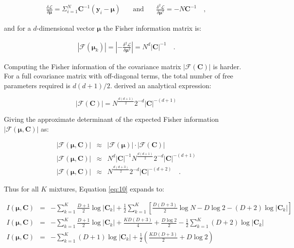 \documentclass{aastex61}
\newcommand{\vect}[1]{\boldsymbol{\mathbf{#1}}}
\def\veccov{\vect{C}}
\def\vecmean{\vect{\mu}}
\def\datum{y}
\def\data{\vect{\datum}}
\def\likelihood{\mathcal{L}}
\begin{document}
\begin{eqnarray}
  \frac{\delta\likelihood}{\delta\vecmean} = \Sigma_{i=1}^{N}\veccov^{-1}(\data_i - \vecmean)
  & \hspace{1em}\textrm{and}\hspace{1em}
  & \frac{\delta^2\likelihood}{\delta\vecmean^2} = -N\veccov^{-1} \quad ,
\end{eqnarray}

\noindent{}and for a $d$-dimensional vector $\vecmean$ the Fisher information
matrix is:

\begin{eqnarray}
  |\mathcal{F}(\vecmean_k)| = \left|-\frac{\delta^2\likelihood}{\delta\vecmean^2}\right| = N^d|\veccov|^{-1} \quad .
\end{eqnarray}

Computing the Fisher information of the covariance matrix 
$|\mathcal{F}\left(\veccov\right)|$ is harder. 
For a full covariance matrix with off-diagonal terms, the total number of free 
parameters required is $d(d+1)/2$.
\citep{Magnus_1988} derived an analytical expression:


\begin{equation}
  |\mathcal{F}\left(\veccov\right)| = N^\frac{d(d+1)}{2}2^{-d}|\veccov|^{-(d+1)}
\end{equation}

\noindent{}Giving the approximate determinant of the expected Fisher information 
$|\mathcal{F}\left(\vecmean,\veccov\right)|$ as:

\begin{eqnarray}
  |\mathcal{F}\left(\vecmean,\veccov\right)| & \approx & |\mathcal{F}\left(\vecmean\right)|\cdot|\mathcal{F}\left(\veccov\right)| \nonumber \\
  |\mathcal{F}\left(\vecmean,\veccov\right)| & \approx & N^{d}|\veccov|^{-1}N^\frac{d(d+1)}{2}2^{-d}|\veccov|^{-(d+1)} \nonumber \\
  |\mathcal{F}\left(\vecmean,\veccov\right)| & \approx & N^\frac{d(d+3)}{2}2^{-d}|\veccov|^{-(d+2)} \quad .
\end{eqnarray}

Thus for all $K$ mixtures, Equation \ref{eq:10} expands to:

\begin{eqnarray}
I(\vecmean, \veccov) &=& -\sum_{k=1}^K\frac{D + 1}{2}\log{|\veccov_k|} 
                         + \frac{1}{2}\sum_{k=1}^K\left[\frac{D(D+3)}{2}\log{N} - D\log{2} - (D + 2)\log{|\veccov_k|}\right] \nonumber \\
I(\vecmean, \veccov) &=& -\sum_{k=1}^K\frac{D + 1}{2}\log{|\veccov_k|}
                         + \frac{KD(D + 3)}{4}
                         + \frac{D\log{2}}{2}
                         - \frac{1}{2}\sum_{k=1}^K (D+2)\log{|\veccov_k|} \nonumber\\
I(\vecmean, \veccov) &=& -\sum_{k=1}^K(D + 1)\log{|\veccov_k|} + \frac{1}{2}\left(\frac{KD(D + 3)}{2} + D\log{2}\right)
\end{eqnarray}
\end{document}
